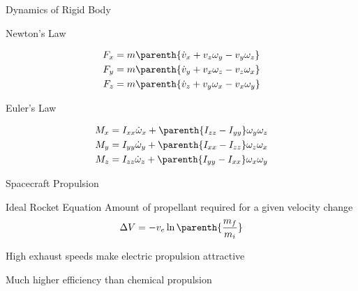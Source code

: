 \begin{frame}[noframenumbering]
\end{frame}%

\begin{frame}[noframenumbering]{Dynamics of Rigid Body} %
    \begin{block}{Newton's Law}
        
        \begin{align*}
            F_x &= m \parenth{\dot{v}_x + v_z \omega_y - v_y \omega_z} \\
            F_y &= m \parenth{\dot{v}_y + v_x \omega_z - v_z \omega_x} \\
            F_z &= m \parenth{\dot{v}_z + v_y \omega_x - v_x \omega_y} \\
        \end{align*}
    \end{block}
    
    \begin{block}{Euler's Law}
        
        \begin{align*}
            {M}_x &= I_{xx} \dot{\omega}_x + \parenth{I_{zz}-I_{yy}} \omega_y \omega_z \\
            {M}_y &= I_{yy} \dot{\omega}_y + \parenth{I_{xx}-I_{zz}} \omega_z \omega_x \\
            {M}_z &= I_{zz} \dot{\omega}_z + \parenth{I_{yy}-I_{xx}} \omega_x \omega_y \\
        \end{align*}
    \end{block}
\end{frame} %

\begin{frame}[noframenumbering]{Spacecraft Propulsion}%
\begin{block}{Ideal Rocket Equation}
    Amount of propellant required for a given velocity change
    \[
        \Delta V = - v_e \ln\parenth{\frac{m_f}{m_i}}
    \]
\end{block}

High exhaust speeds make electric propulsion attractive

Much higher efficiency than chemical propulsion
\end{frame} %

